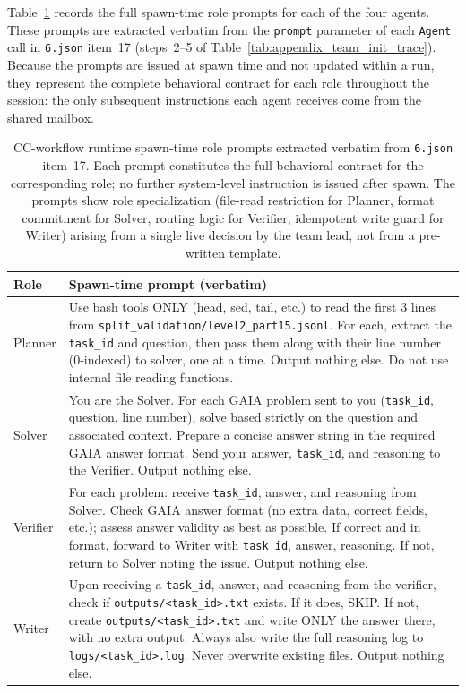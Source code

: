 Table~\ref{tab:appendix_cc_workflow_role_prompts} records the full spawn-time role prompts for each of the four agents. These prompts are extracted verbatim from the \texttt{prompt} parameter of each \texttt{Agent} call in \texttt{6.json} item~17 (steps~2--5 of Table~\ref{tab:appendix_team_init_trace}). Because the prompts are issued at spawn time and not updated within a run, they represent the complete behavioral contract for each role throughout the session: the only subsequent instructions each agent receives come from the shared mailbox.

\begin{table}[t]
\centering
\caption{CC-workflow runtime spawn-time role prompts extracted verbatim from \texttt{6.json} item~17. Each prompt constitutes the full behavioral contract for the corresponding role; no further system-level instruction is issued after spawn. The prompts show role specialization (file-read restriction for Planner, format commitment for Solver, routing logic for Verifier, idempotent write guard for Writer) arising from a single live decision by the team lead, not from a pre-written template.}
\label{tab:appendix_cc_workflow_role_prompts}
\footnotesize
\setlength{\tabcolsep}{4pt}
\renewcommand{\arraystretch}{1.12}
\begin{tabular}{p{}p{}}
\toprule
\textbf{Role} & \textbf{Spawn-time prompt (verbatim)} \\
\midrule
Planner & Use bash tools ONLY (head, sed, tail, etc.) to read the first 3 lines from \texttt{split\_validation/level2\_part15.jsonl}. For each, extract the \texttt{task\_id} and question, then pass them along with their line number (0-indexed) to solver, one at a time. Output nothing else. Do not use internal file reading functions. \\
\midrule
Solver & You are the Solver. For each GAIA problem sent to you (\texttt{task\_id}, question, line number), solve based strictly on the question and associated context. Prepare a concise answer string in the required GAIA answer format. Send your answer, \texttt{task\_id}, and reasoning to the Verifier. Output nothing else. \\
\midrule
Verifier & For each problem: receive \texttt{task\_id}, answer, and reasoning from Solver. Check GAIA answer format (no extra data, correct fields, etc.); assess answer validity as best as possible. If correct and in format, forward to Writer with \texttt{task\_id}, answer, reasoning. If not, return to Solver noting the issue. Output nothing else. \\
\midrule
Writer & Upon receiving a \texttt{task\_id}, answer, and reasoning from the verifier, check if \texttt{outputs/<task\_id>.txt} exists. If it does, SKIP. If not, create \texttt{outputs/<task\_id>.txt} and write ONLY the answer there, with no extra output. Always also write the full reasoning log to \texttt{logs/<task\_id>.log}. Never overwrite existing files. Output nothing else. \\
\bottomrule
\end{tabular}
\end{table}


